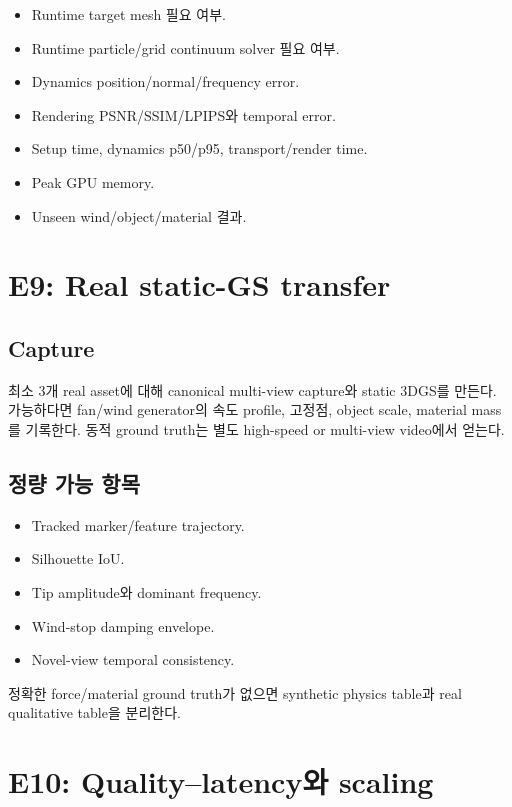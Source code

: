 \documentclass[11pt,a4paper]{article}
\begin{document}
\begin{itemize}[leftmargin=1.5em]
  \item Runtime target mesh 필요 여부.
  \item Runtime particle/grid continuum solver 필요 여부.
  \item Dynamics position/normal/frequency error.
  \item Rendering PSNR/SSIM/LPIPS와 temporal error.
  \item Setup time, dynamics p50/p95, transport/render time.
  \item Peak GPU memory.
  \item Unseen wind/object/material 결과.
\end{itemize}

\section{E9: Real static-GS transfer}

\subsection*{Capture}

최소 3개 real asset에 대해 canonical multi-view capture와 static 3DGS를 만든다.
가능하다면 fan/wind generator의 속도 profile,
고정점, object scale, material mass를 기록한다.
동적 ground truth는 별도 high-speed or multi-view video에서 얻는다.

\subsection*{정량 가능 항목}

\begin{itemize}[leftmargin=1.5em]
  \item Tracked marker/feature trajectory.
  \item Silhouette IoU.
  \item Tip amplitude와 dominant frequency.
  \item Wind-stop damping envelope.
  \item Novel-view temporal consistency.
\end{itemize}

정확한 force/material ground truth가 없으면
synthetic physics table과 real qualitative table을 분리한다.

\section{E10: Quality--latency와 scaling}
\end{document}
